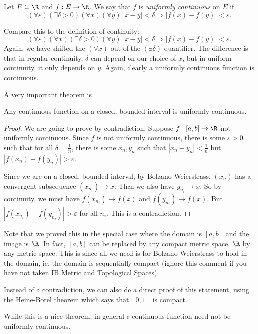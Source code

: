 \documentclass[a4paper]{article}
\begin{document}
\begin{defi}
  Let $E \subseteq \R$ and $f: E\to \R$. We say that $f$ is \emph{uniformly continuous} on $E$ if
  \[
    (\forall \varepsilon)(\exists \delta > 0)(\forall x)(\forall y)\; |x - y| < \delta \Rightarrow |f(x) - f(y)| < \varepsilon.
  \]
\end{defi}
Compare this to the definition of continuity:
\[
  (\forall \varepsilon)(\forall x)(\exists \delta > 0)(\forall y)\; |x - y| < \delta \Rightarrow |f(x) - f(y)| < \varepsilon.
\]
Again, we have shifted the $(\forall x)$ out of the $(\exists \delta)$ quantifier. The difference is that in regular continuity, $\delta$ can depend on our choice of $x$, but in uniform continuity, it only depends on $y$. Again, clearly a uniformly continuous function is continuous.

A very important theorem is
\begin{thm}[]
  Any continuous function on a closed, bounded interval is uniformly continuous.
\end{thm}

\begin{proof}
  We are going to prove by contradiction. Suppose $f: [a, b] \to \R$ not uniformly continuous. Since $f$ is not uniformly continuous, there is some $\varepsilon > 0$ such that for all $\delta = \frac{1}{n}$, there is some $x_n, y_n$ such that $|x_n - y_n| < \frac{1}{n}$ but $|f(x_n) - f(y_n)| > \varepsilon$.

  Since we are on a closed, bounded interval, by Bolzano-Weierstrass, $(x_n)$ has a convergent subsequence $(x_{n_i}) \to x$. Then we also have $y_{n_i}\to x$. So by continuity, we must have $f(x_{n_i}) \to f(x)$ and $f(y_{n_i}) \to f(x)$. But $|f(x_{n_i}) - f(y_{n_i})| > \varepsilon$ for all $n_i$. This is a contradiction.
\end{proof}
Note that we proved this in the special case where the domain is $[a, b]$ and the image is $\R$. In fact, $[a, b]$ can be replaced by any compact metric space, $\R$ by any metric space. This is since all we need is for Bolzano-Weierstrass to hold in the domain, ie. the domain is sequentially compact (ignore this comment if you have not taken IB Metric and Topological Spaces).

Instead of a contradiction, we can also do a direct proof of this statement, using the Heine-Borel theorem which says that $[0, 1]$ is compact.

While this is a nice theorem, in general a continuous function need not be uniformly continuous.
\end{document}
